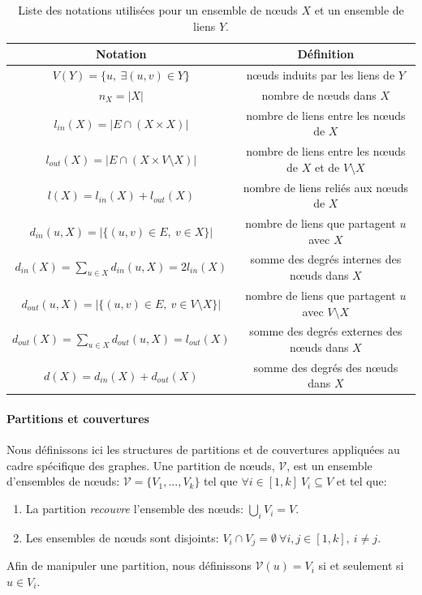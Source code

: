 \begin{table}
  \centering
    \begin{tabular}{|c|c|}
     \hline
    \rule[-1ex]{0pt}{4ex} Notation & Définition \\
  \hline
		\hline
		\rule[-1ex]{0pt}{4ex}$V(Y)=\{u,\ \exists (u,v) \in Y \}$ & n\oe{}uds induits par les liens de $Y$\\
		\hline
        \rule[-1ex]{0pt}{4ex}$n_X=|X|$ & nombre de n\oe{}uds dans $X$\\
        \hline
        \rule[-1ex]{0pt}{4ex} $l_{in}(X)=|E \cap (X \times X)|$ & nombre de liens entre les n\oe{}uds de $X$\\
        \hline
        \rule[-1ex]{0pt}{4ex} $l_{out}(X)=|E \cap (X \times V \setminus X)|$ & nombre de liens entre les n\oe{}uds de $X$ et de $V \setminus X$ \\
        \hline
        \rule[-1ex]{0pt}{4ex} $l(X)=l_{in}(X)+l_{out}(X)$ & nombre de liens reliés aux n\oe{}uds de $X$\\
        \hline
        \rule[-1ex]{0pt}{4ex} $d_{in}(u,X)=|\{(u,v) \in E,\ v \in X\}|$ & nombre de liens que partagent $u$ avec $X$ \\
        \hline
        \rule[-1ex]{0pt}{4ex} $d_{in}(X)=\sum_{u \in X} d_{in}(u,X)=2l_{in}(X)$ & somme des degrés internes des n\oe{}uds dans $X$ \\
        \hline
        \rule[-1ex]{0pt}{4ex} $d_{out}(u,X)=|\{(u,v) \in E,\ v \in V \setminus X\}|$ & nombre de liens que partagent $u$ avec $V \setminus X$ \\
        \hline
       \rule[-1ex]{0pt}{4ex}  $d_{out}(X)=\sum_{u \in X} d_{out}(u,X)=l_{out}(X)$ & somme des degrés externes des n\oe{}uds dans $X$ \\
        \hline
        \rule[-1ex]{0pt}{4ex}  $d(X)=d_{in}(X)+ d_{out}(X)$ & somme des degrés des n\oe{}uds dans $X$ \\
        \hline
    \end{tabular}
    \caption{Liste des notations utilisées pour un ensemble de n\oe{}uds $X$ et un ensemble de liens $Y$.}
         \label{tab:notation_groupe_noeuds}
\end{table}%


\paragraph{Partitions et couvertures}
Nous définissons ici les structures de partitions et de couvertures appliquées au cadre spécifique des graphes.
Une partition de n\oe{}uds, $\mathcal{V}$, est un ensemble d'ensembles de n\oe{}uds: $\mathcal{V}= \{V_1,..., V_k\}$ tel que $\forall i \in [1,k]\ V_i \subseteq V$ et tel que:
\begin{enumerate}
\item La partition \emph{recouvre} l'ensemble des n\oe{}uds: $\bigcup_{i} V_i = V$.
\item Les ensembles de n\oe{}uds sont disjoints: $V_i \cap V_j = \emptyset\ \forall i,j \in [1,k],\ i \neq j$.
\end{enumerate}
Afin de manipuler une partition, nous définissons $\mathcal{V}(u)=V_i$ si et seulement si $u \in V_i$.
\bigskip

